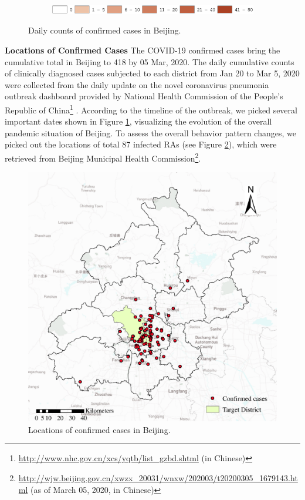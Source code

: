 \documentclass[preprints,ijgi,submit,moreauthors]{Definitions/mdpi}
\begin{document}
\begin{figure}[ht]
    \vspace{6pt}
    \begin{subfigure}{0.7\textwidth}
        \includegraphics[width=\textwidth]{Figures/Fig2legend.eps}
    \end{subfigure}
    \caption{Daily counts of confirmed cases in Beijing.}
    \label{fig:number_of_confirmed_cases}
\end{figure}

\textbf{Locations of Confirmed Cases}
The COVID-19 confirmed cases bring the cumulative total in Beijing to 418 by 05 Mar, 2020.
The daily cumulative counts of clinically diagnosed cases subjected to each district from Jan 20 to Mar 5, 2020 were collected from the daily update on the novel coronavirus pneumonia outbreak dashboard provided by National Health Commission of the People's Republic of China\footnote{\url{http://www.nhc.gov.cn/xcs/yqtb/list_gzbd.shtml} (in Chinese)} .
According to the timeline \cite{li2020early} of the outbreak, we picked several important dates shown in Figure \ref{fig:number_of_confirmed_cases}, visualizing the evolution of the overall pandemic situation of Beijing.
To assess the overall behavior pattern changes, we picked out the locations of total 87 infected RAs (see Figure \ref{fig:locations_of_confirmed_cases}), which were retrieved from Beijing Municipal Health Commission\footnote{\url{http://wjw.beijing.gov.cn/xwzx_20031/wnxw/202003/t20200305_1679143.html} (as of March 05, 2020, in Chinese)}.

\begin{figure}[ht]
    \centering
    \includegraphics[width=.5\textwidth]{Figures/Plot_location_confirmed_cases.eps}
    \caption{Locations of confirmed cases in Beijing.}
    \label{fig:locations_of_confirmed_cases}
\end{figure}
\end{document}
